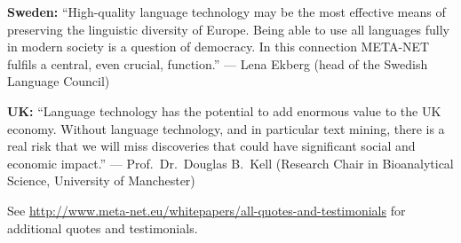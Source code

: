 \documentclass[10pt, plain]{../../metanetpaper}
\begin{document}
\bigskip \textbf{Sweden:} ``High-quality language technology may be the most effective means of preserving the linguistic diversity of Europe. Being able to use all languages fully in modern society is a question of democracy. In this connection META-NET fulfils a central, even crucial, function.'' --- Lena Ekberg (head of the Swedish Language Council)

\bigskip \textbf{UK:} ``Language technology has the potential to add enormous value to the UK economy. Without language technology, and in particular text mining, there is a real risk that we will miss discoveries that could have significant social and economic impact.'' --- Prof.~Dr.~Douglas B.~Kell (Research Chair in Bioanalytical Science, University of Manchester)

\bigskip \centerline{See \url{http://www.meta-net.eu/whitepapers/all-quotes-and-testimonials} for additional quotes and testimonials.}

\clearpage



\renewcommand\contentsname{}
\tableofcontents


\clearpage


\setcounter{page}{1}
\pagestyle{scrheadings}

\clearpage
\end{document}
